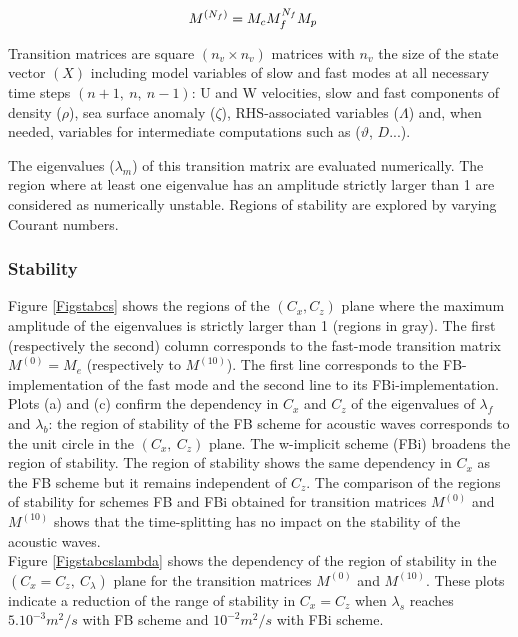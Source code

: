 \documentclass[a4paper]{article}
\numberwithin{equation}{section}
\begin{document}
\begin{equation}
   \begin{split}
    \displaystyle
     & M^{(N_f)} = M_c M_f^{N_f} M_p
   \end{split}
\end{equation}

Transition matrices are square $(n_v\times n_v)$ matrices with $n_v$ the size of the state vector $(X)$ including model variables of slow and fast modes at all necessary time steps $(n+1,\ n,\ n-1)$: U and W velocities, slow and fast components of density ($\rho$), sea surface anomaly ($\zeta$), RHS-associated variables ($\Lambda$) and, when needed, variables for intermediate computations such as ($\vartheta$, $D$...).

The eigenvalues ($\lambda_m$) of this transition matrix are evaluated numerically. The region where at least one eigenvalue has an amplitude strictly larger than 1 are considered as numerically unstable. Regions of stability are explored by varying Courant numbers.\\

\subsubsection{Stability}

Figure \ref{Figstabcs} shows the regions of the $(C_x, C_z)$ plane where the maximum amplitude of the eigenvalues is strictly larger than 1 (regions in gray). The first (respectively the second) column corresponds  to the fast-mode transition matrix $M^{(0)}=M_e$ (respectively to $M^{(10)}$). The first line corresponds to the FB-implementation of the fast mode and the second line to its FBi-implementation.\\
Plots (a) and (c) confirm the dependency in $C_{x}$ and $C_{z}$ of the eigenvalues of $\lambda_f$ and  $\lambda_b$: the region of stability of the FB scheme for acoustic waves corresponds to the unit circle in the $(C_x,\ C_z)$ plane. The w-implicit scheme (FBi) broadens the region of stability. The region of stability shows the same dependency in $C_x$ as the FB scheme but it remains independent of $C_z$. The  comparison of the regions of stability for schemes FB and FBi obtained for transition matrices $M^{(0)}$ and $M^{(10)}$ shows that the time-splitting has no impact on the stability of the acoustic waves.\\

Figure \ref{Figstabcslambda} shows the dependency of the region of stability in the  $(C_x=C_z,\ C_{\lambda})$ plane for the transition matrices $M^{(0)}$ and $M^{(10)}$. These plots indicate a reduction of the range of stability in $C_x=C_z$ when $\lambda_s$ reaches $5.10^{-3} m^2/s$ with FB scheme and $10^{-2} m^2/s$ with FBi scheme.\\
\end{document}
